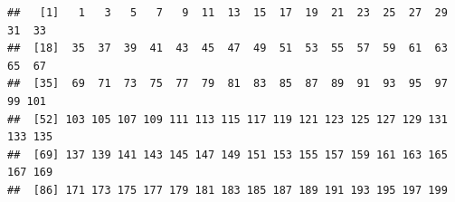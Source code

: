 \documentclass[]{article}
\begin{document}
\begin{verbatim}
##   [1]   1   3   5   7   9  11  13  15  17  19  21  23  25  27  29  31  33
##  [18]  35  37  39  41  43  45  47  49  51  53  55  57  59  61  63  65  67
##  [35]  69  71  73  75  77  79  81  83  85  87  89  91  93  95  97  99 101
##  [52] 103 105 107 109 111 113 115 117 119 121 123 125 127 129 131 133 135
##  [69] 137 139 141 143 145 147 149 151 153 155 157 159 161 163 165 167 169
##  [86] 171 173 175 177 179 181 183 185 187 189 191 193 195 197 199
\end{verbatim}
\end{document}
